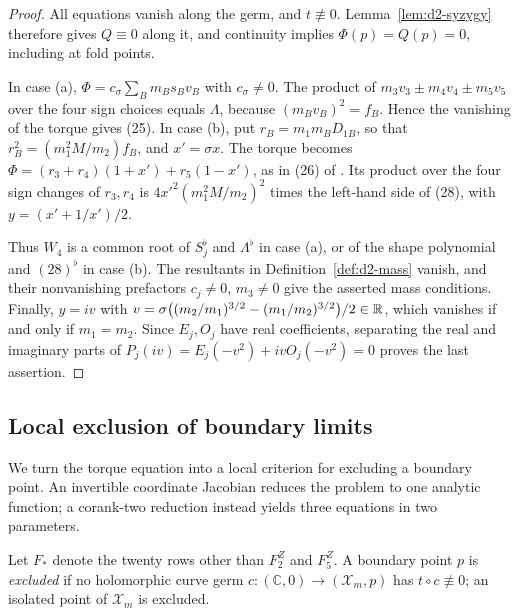 \documentclass[Threeside,11pt]{article}
\theoremstyle{definition}
\theoremstyle{remark}
\numberwithin{equation}{section}
\newcommand{\C}{\mathbb C}\newcommand{\T}{\mathbb T}
\theoremstyle{remark}
\begin{document}
\begin{proof}
{All equations vanish along the germ, and $t\not\equiv0$.
Lemma~\ref{lem:d2-syzygy} therefore gives $Q\equiv0$ along it, and continuity implies
$\Phi(p)=Q(p)=0$, including at fold points.}

{In case (a), $\Phi=c_\sigma\sum_Bm_Bs_Bv_B$ with $c_\sigma\ne0$.
The product of $m_3v_3\pm m_4v_4\pm m_5v_5$ over the four sign choices equals $\Lambda$,
because $(m_Bv_B)^2=f_B$.  Hence the vanishing of the torque gives (25).
In case (b), put $r_B=m_1m_BD_{1B}$, so that $r_B^2=(m_1^2M/m_2)f_B$, and $x'=\sigma x$.
The torque becomes $\Phi=(r_3+r_4)(1+x')+r_5(1-x')$, as in (26) of \cite[\S8.2]{AK}.
Its product over the four sign changes of $r_3,r_4$ is $4x'^2(m_1^2M/m_2)^2$ times the
left-hand side of (28), with $y=(x'+1/x')/2$.}

{Thus $W_4$ is a common root of $S_j^\flat$ and $\Lambda^\flat$ in
case (a), or of the shape polynomial and $(28)^\flat$ in case (b).
The resultants in Definition~\ref{def:d2-mass} vanish, and their nonvanishing prefactors
$c_j\ne0$, $m_3\ne0$ give the asserted mass conditions.
Finally, $y=iv$ with $v=\sigma\bigl((m_2/m_1)^{3/2}-(m_1/m_2)^{3/2}\bigr)/2\in\mathbb R$,
which vanishes if and only if $m_1=m_2$.
Since $E_j,O_j$ have real coefficients, separating the real and imaginary parts of
$P_j(iv)=E_j(-v^2)+ivO_j(-v^2)=0$ proves the last assertion.}
\end{proof}

\subsection{\texorpdfstring{Local exclusion of boundary limits}{Local exclusion of boundary limits}}\label{sec:d2-isolation}

We turn the torque equation into a local criterion for excluding a boundary point.
An invertible coordinate Jacobian reduces the problem to one analytic function;
a corank-two reduction instead yields three equations in two parameters.

Let $F_*$ denote the twenty rows other than $F^Z_2$ and $F^Z_5$.  A boundary point $p$ is
\emph{excluded} if no holomorphic curve germ $c\colon(\C,0)\to(\mathcal X_m,p)$ has
$t\circ c\not\equiv0$; an isolated point of $\mathcal X_m$ is excluded.
\end{document}
